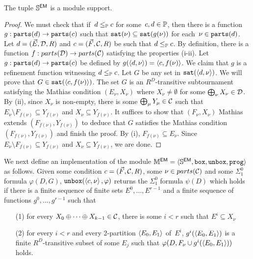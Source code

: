 \begin{lemma}
The tuple $\mathbb{S}^{\operatorname{\sf{EM}}}$ is a module support.
\end{lemma}
\begin{proof}
We must check that if~$d \leq_{\mathbb{P}} c$ for some~$c, d \in \mathbb{P}$, then there is a function~$g : \mathtt{parts}(d) \to \mathtt{parts}(c)$
such that $\mathtt{sat}(\nu) \subseteq \mathtt{sat}(g(\nu))$ for each~$\nu \in \mathtt{parts}(d)$.
Let $d = (\vec{E}, \mathcal{D}, R)$ and $c = (\vec{F}, \mathcal{C}, R)$ be such that $d \leq_{\mathbb{P}} c$.
By definition, there is a function $f : parts(\mathcal{D}) \to parts(\mathcal{C})$ satisfying
the properties (i-ii). Let $g : \mathtt{parts}(d) \to \mathtt{parts}(c)$ be defined by $g(\left\langle d, \nu \right\rangle) = \left\langle c, f(\nu) \right\rangle$.
We claim that $g$ is a refinement function witnessing $d \leq_{\mathbb{P}} c$.
Let $G$ be any set in $\mathtt{sat}(\left\langle d, \nu \right\rangle)$. We will prove that $G \in \mathtt{sat}(\left\langle c, f(\nu) \right\rangle)$.
The set $G$ is an $R^D$-transitive subtournament
satisfying the Mathias condition $(E_\nu, X_\nu)$ where $X_\nu \neq \emptyset$ for some $\bigoplus_\nu X_\nu \in \mathcal{D}$.
By (ii), since $X_\nu$ is non-empty, there is some $\bigoplus_\mu Y_\mu \in \mathcal{C}$ 
such that $E_\nu \setminus F_{f(\nu)} \subseteq Y_{f(\nu)}$
and $X_\nu \subseteq Y_{f(\nu)}$. It suffices to show that $(F_\nu, X_\nu)$
Mathias extends $(F_{f(\nu)}, Y_{f(\nu)})$ to deduce that $G$ satisfies the Mathias condition $(F_{f(\nu)}, Y_{f(\nu)})$
and finish the proof. By (i), $F_{f(\nu)} \subseteq E_\nu$.
Since $E_\nu \setminus F_{f(\nu)} \subseteq Y_{f(\nu)}$ and $X_\nu \subseteq Y_{f(\nu)}$, we are done.
\end{proof}

We next define an implementation of the module $\mathbb{M}^{\operatorname{\sf{EM}}} = \langle \mathbb{S}^{\operatorname{\sf{EM}}}, \mathtt{box}, \mathtt{unbox}, \mathtt{prog} \rangle$ as follows.
Given some condition $c = (\vec{F}, \mathcal{C}, R)$, some $\nu \in parts(\mathcal{C})$ and some
$\Sigma^0_1$ formula $\varphi(D, G)$, $\mathtt{unbox}(\left\langle c,\nu \right\rangle, \varphi)$ returns the $\Sigma^0_1$ formula $\psi(D)$ which holds
if there is a finite sequence of finite sets $E^0, \dots, E^{r-1}$ and a finite sequence of functions $g^0, \dots, g^{r-1}$ such that
\begin{itemize}
	\item[(1)] for every $X_0 \oplus \dots \oplus X_{k-1} \in \mathcal{C}$, there is some $i < r$ such that $E^i \subseteq X_\nu$
	\item[(2)] for every $i < r$ and every 2-partition $\left\langle E_0, E_1 \right\rangle$ of~$E^i$,
	$g^i(\left\langle E_0, E_1 \right\rangle)$ is a finite $R^D$-transitive subset of some $E_j$ such that $\varphi(D, F_\nu \cup g^i(\left\langle E_0, E_1 \right\rangle))$ holds.
\end{itemize}


